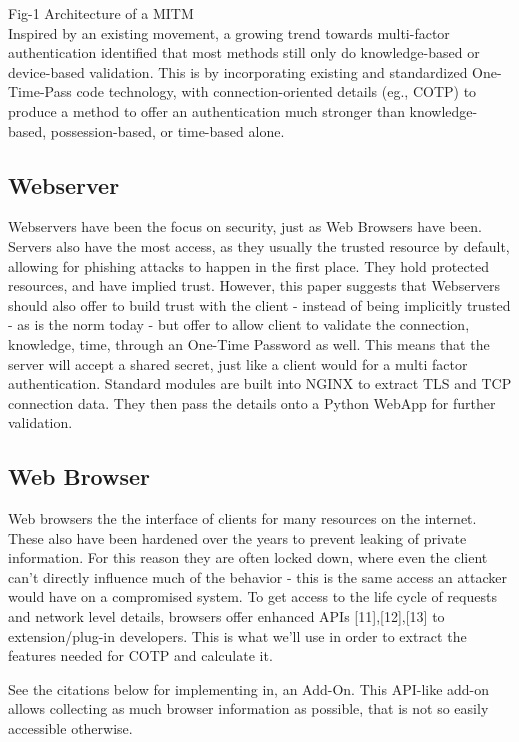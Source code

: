 \documentclass[a4paper, 11pt]{article} 				%
\begin{document}
Fig-1 Architecture of a MITM\\ 

Inspired by an existing movement, a growing trend towards multi-factor authentication
identified that most methods still only do knowledge-based or device-based validation. This is by incorporating existing and standardized One-Time-Pass code technology, with connection-oriented details (eg., COTP) to produce a method to offer an authentication much stronger than knowledge-based, possession-based, or time-based alone. 

\subsection{Webserver}
Webservers have been the focus on security, just as Web Browsers have been. Servers also have the most access, as they usually the trusted resource by default, allowing for phishing attacks to happen in the first place. They hold protected resources, and have implied trust. However, this paper suggests that Webservers should also offer to build trust with the client - instead of being implicitly trusted - as is the norm today - but offer to allow client to validate the connection, knowledge, time, through an One-Time Password as well. This means that the server will accept a shared secret, just like a client would for a multi factor authentication. Standard modules are built into NGINX to extract TLS and TCP connection data. They then pass the details onto a Python WebApp for further validation.

\subsection{Web Browser}
Web browsers the the interface of clients for many resources on the internet. These also have been hardened over the years to prevent leaking of private information. For this reason they are often locked down, where even the client can't directly influence much of the behavior - this is the same access an attacker would have on a compromised system. To get access to the life cycle of requests and network level details, browsers offer enhanced APIs [11],[12],[13] to extension/plug-in developers. This is what we'll use in order to extract the features needed for COTP and calculate it.

\noindent
[10][11][12][13]See the citations below for implementing in, an Add-On. This API-like add-on allows collecting as much browser information as possible, that is not so easily accessible otherwise.\\
\end{document}
